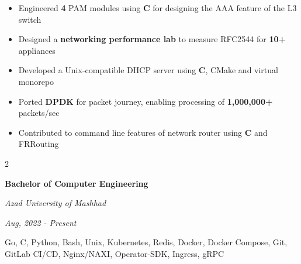\documentclass{engineercv}
\begin{document}
\begin{itemize}
  \item Engineered \textbf{4} PAM modules using \textbf{C} for designing the AAA feature of the L3 switch
  \item Designed a \textbf{networking performance lab} to measure RFC2544 for \textbf{10+} appliances
  \item Developed a Unix-compatible DHCP server using \textbf{C}, CMake and virtual monorepo
  \item Ported \textbf{DPDK} for packet journey, enabling processing of \textbf{1,000,000+} packets/sec
  \item Contributed to command line features of network router using \textbf{C} and FRRouting
\end{itemize}

\vspace{0.4cm}

\begin{minipage}{\textwidth}
  \begin{multicols}{2}
    \begin{minipage}{0.5\textwidth}
      \textbf{Bachelor of Computer Engineering}

      \textit{Azad University of Mashhad}

      \textit{Aug, 2022 - Present}
    \end{minipage}
    \columnbreak
    \begin{minipage}{0.5\textwidth}
      Go, C, Python, Bash, Unix, Kubernetes, Redis, Docker, Docker Compose, Git, GitLab CI/CD,
      Nginx/NAXI, Operator-SDK, Ingress, gRPC
    \end{minipage}
  \end{multicols}
\end{minipage}
\end{document}

